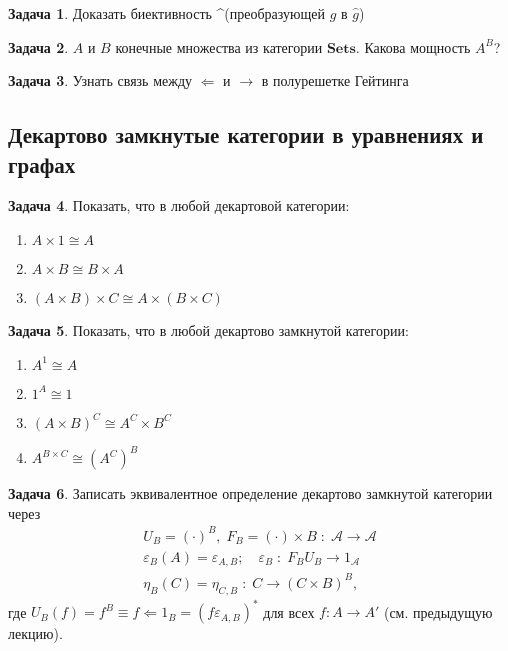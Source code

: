 \documentclass[10pt]{article}
\theoremstyle{definition}
\newtheorem{Pm}{Задача}[subsection]
\begin{document}
\begin{Pm}
    Доказать биективность \textasciicircum \;(преобразующей $g$ в $\hat{g}$)
\end{Pm}

\begin{Pm}
    $A$ и $B$ конечные множества из категории $\mathbf{Sets}$. Какова мощность $A^B$?
\end{Pm}

\begin{Pm}
    Узнать связь между $\Leftarrow$ и $\rightarrow$ в полурешетке Гейтинга
\end{Pm}

\subsection{Декартово замкнутые категории в уравнениях и графах}
\begin{Pm}
Показать, что в любой декартовой категории:
\begin{enumerate}
\item $A \times 1 \cong A$
\item $A \times B \cong B \times A$
\item $(A \times B) \times C \cong A \times (B \times C)$
\end{enumerate}
\end{Pm}

\begin{Pm}
Показать, что в любой декартово замкнутой категории:
\begin{enumerate}
\item $A^1 \cong A$
\item $1^A \cong 1$
\item $(A \times B)^C \cong A^C \times B^C$
\item $A^{B \times C} \cong (A^C)^B$
\end{enumerate}
\end{Pm}

\begin{Pm}
Записать эквивалентное определение декартово замкнутой категории через
\begin{gather*}
U_B = (\cdot)^B,\; F_B = (\cdot) \times B\; :\; \mathscr{A} \rightarrow \mathscr{A} \\
\varepsilon_B(A) = \varepsilon_{A,B};\quad \varepsilon_B\; :\; F_B U_B \rightarrow 1_\mathscr{A} \\
\eta_B(C) = \eta_{C,B}\; :\; C \rightarrow (C \times B)^B\text{,}
\end{gather*}
где $U_B(f) = f^B \equiv f \Leftarrow 1_B = (f\varepsilon_{A,B})^*$ для всех $f : A \rightarrow A'$ (см. предыдущую лекцию).
\end{Pm}
\end{document}
